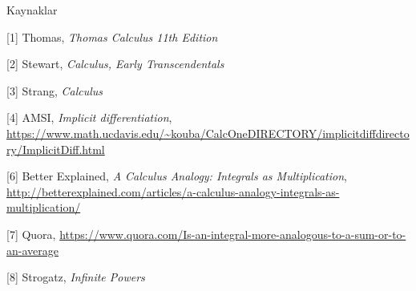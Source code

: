 \documentclass[12pt,fleqn]{article}\usepackage{../../common}
\begin{document}
Kaynaklar

[1] Thomas, {\em Thomas Calculus 11th Edition}

[2] Stewart, {\em Calculus, Early Transcendentals}

[3] Strang, {\em Calculus}

[4] AMSI, {\em Implicit differentiation},
    \url{https://www.math.ucdavis.edu/~kouba/CalcOneDIRECTORY/implicitdiffdirectory/ImplicitDiff.html}

[6] Better Explained, {\em A Calculus Analogy: Integrals as  Multiplication},
    \url{http://betterexplained.com/articles/a-calculus-analogy-integrals-as-multiplication/}

[7] Quora, \url{https://www.quora.com/Is-an-integral-more-analogous-to-a-sum-or-to-an-average}

[8] Strogatz, {\em Infinite Powers}
\end{document}
